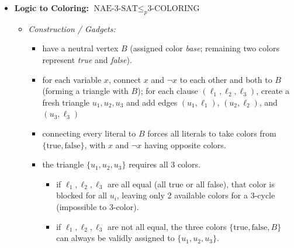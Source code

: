\documentclass[a4paper, 11pt]{report}
\begin{document}
\begin{itemize}
    \begin{itemize}
        \item $\text{CLIQUE} \le_p \text{IS}$:
        \begin{itemize}
            \item \textit{map:} $(G, k) \mapsto (\overline{G}, k)$, where $\overline{G}$ is the complement graph
            \item a subset $S \subseteq V$ forms a clique in $G$ (all pairs connected) $\iff$ $S$ is an independent set in $\overline{G}$ (no pairs connected)
        \end{itemize}
        \item $\text{IS} \le_p \text{VC}$:
        \begin{itemize}
            \item \textit{map:} $(G, k) \mapsto (G, |V| - k)$ (flip the target size)
            \item $S$ is an independent set $\iff V \setminus S$ is a vertex cover: since no edge can have both endpoints in $S$, every edge must touch at least one vertex in $V \setminus S$; thus, an IS of size $\ge k$ exists $\iff$ a VC of size $\le |V| - k$ exists
        \end{itemize}
    \end{itemize}

\item \textbf{Logic to Coloring:} $\text{NAE-3-SAT} \le_p \text{3-COLORING}$
    \begin{itemize}
        \item \textit{Construction / Gadgets:}
        \begin{itemize}
            \item have a neutral vertex $B$ (assigned color \textit{base}; remaining two colors represent \textit{true} and \textit{false}).
            \item for each variable $x$, connect $x$ and $\neg x$ to each other and both to $B$ (forming a triangle with $B$); for each clause $(\ell_1, \ell_2, \ell_3)$, create a fresh triangle $u_1, u_2, u_3$ and add edges $(u_1, \ell_1)$, $(u_2, \ell_2)$, and $(u_3, \ell_3)$
            \item connecting every literal to $B$ forces all literals to take colors from $\{\text{true}, \text{false}\}$, with $x$ and $\neg x$ having opposite colors.
            \item the triangle $\{u_1, u_2, u_3\}$ requires all 3 colors.
            \begin{itemize}
                \item if $\ell_1, \ell_2, \ell_3$ are all equal (all true or all false), that color is blocked for all $u_i$, leaving only 2 available colors for a 3-cycle (impossible to 3-color).
                \item if $\ell_1, \ell_2, \ell_3$ are not all equal, the three colors $\{\text{true}, \text{false}, B\}$ can always be validly assigned to $\{u_1, u_2, u_3\}$.
            \end{itemize}
        \end{itemize}
    \end{itemize}

\end{itemize}
\end{document}
